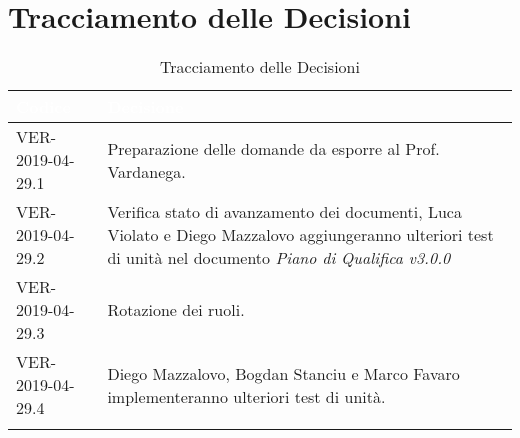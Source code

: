 \newpage
\section{Tracciamento delle Decisioni}

\begin{longtable}{|C{.33\textwidth}|C{.61\textwidth}|}
\hline
{}\textbf{\textcolor{white}{Codice}} & \textbf{\textcolor{white}{Decisione}}\\
\hline
VER-2019-04-29.1 & Preparazione delle domande da esporre al Prof. Vardanega. \\
\hline
{}VER-2019-04-29.2 & Verifica stato di avanzamento dei documenti, Luca Violato e Diego Mazzalovo aggiungeranno ulteriori test di unità nel  documento \textit{Piano di Qualifica v3.0.0}  \\
\hline
VER-2019-04-29.3 & Rotazione dei ruoli. \\
\hline
{}VER-2019-04-29.4 & Diego Mazzalovo, Bogdan Stanciu e Marco Favaro implementeranno ulteriori test di unità.\\
\hline

\caption{Tracciamento delle Decisioni}
\end{longtable}
